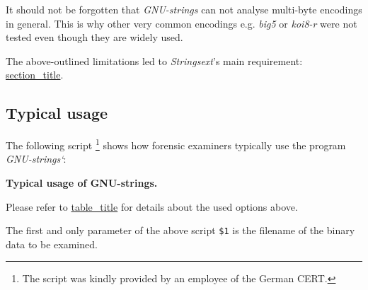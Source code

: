 It should not be forgotten that \emph{GNU-strings} can not analyse
multi-byte encodings in general. This is why other very common encodings
e.g. \emph{big5} or \emph{koi8-r} were not tested even though they are
widely used.

The above-outlined limitations led to \emph{Strings­ext}'s main
requirement:
\protect\hyperlink{character-encoding-support}{section\_title}.

\hypertarget{_typical_usage}{\subsection{Typical
usage}\label{_typical_usage}}

The following script \footnote{The script was kindly provided by an
  employee of the German CERT.} shows how forensic examiners typically
use the program \emph{GNU-strings`}:

\textbf{Typical usage of GNU-strings.}

\begin{Shaded}
\begin{Highlighting}[]
  \OperatorTok{>} 
  \OperatorTok{>>} 
  \OperatorTok{>>} 
  \OperatorTok{>>} 
  \OperatorTok{>>} 
  \OperatorTok{>>} 
  \OperatorTok{>>} 
 \OperatorTok{>} 
 
\end{Highlighting}
\end{Shaded}

Please refer to \protect\hyperlink{legend-strings}{table\_title} for
details about the used options above.

The first and only parameter of the above script \texttt{\$1} is the
filename of the binary data to be examined.

